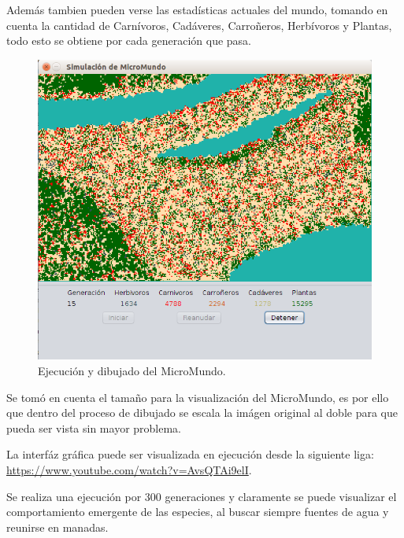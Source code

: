     Además tambien pueden verse las estadísticas actuales del mundo, tomando en cuenta la cantidad de Carnívoros, Cadáveres, Carroñeros, Herbívoros y Plantas, todo esto se obtiene por cada generación que pasa.
    \linebreak
    \begin{figure}[h!]
      \centering
        \includegraphics[scale=0.4]{./images/MicroWorldProcess.png}
        \caption{Ejecución y dibujado del MicroMundo.} 
    \end{figure}
    \linebreak
    Se tomó en cuenta el tamaño para la visualización del MicroMundo, es por ello que dentro del proceso de dibujado se escala la imágen original al doble para que pueda ser vista sin mayor problema. 

    La interfáz gráfica puede ser visualizada en ejecución desde la siguiente liga: \url{https://www.youtube.com/watch?v=AvsQTAi9elI}. 

    Se realiza una ejecución por 300 generaciones y claramente se puede visualizar el comportamiento emergente de las especies, al buscar siempre fuentes de agua y reunirse en manadas. 